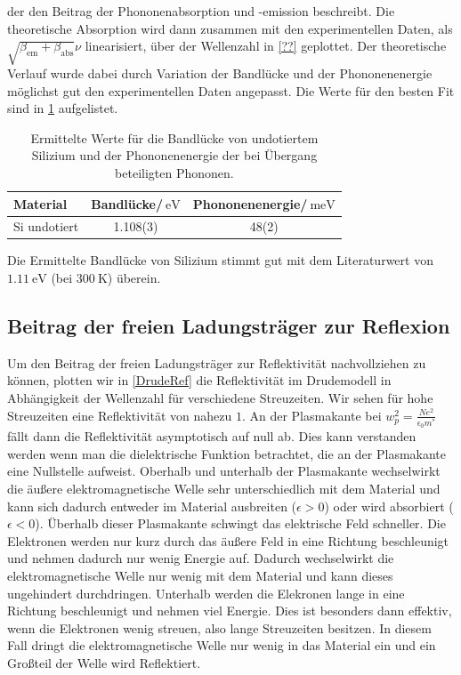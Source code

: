 \documentclass[paper=a4,fontsize=10pt,DIV=18,twocolumn,parskip=half]{scrartcl}
\numberwithin{equation}{section}    %
\begin{document}
der den Beitrag der Phononenabsorption und \mbox{-emission} beschreibt. Die 
theoretische Absorption wird dann zusammen mit den experimentellen Daten, als 
$\sqrt{\beta _{\text{em} }+\beta _{\text{abs} }}\nu $ linearisiert, über der 
Wellenzahl in \cref{??} geplottet. Der theoretische Verlauf wurde dabei durch 
Variation der Bandlücke und der Phononenenergie möglichst gut den 
experimentellen Daten angepasst. Die Werte für den besten Fit sind in \cref{phe} 
aufgelistet.
\begin{table}
    \begin{center}
\begin{tabular}{ l | c c }
  Material & Bandlücke/$\SI{}{\eV}$ & Phononenenergie/$\SI{}{\milli\eV}$\\
  \hline
  Si undotiert & 1.108(3) & 48(2)
\end{tabular}
  \caption{Ermittelte Werte für die Bandlücke von undotiertem Silizium und der 
  Phononenenergie der bei Übergang beteiligten Phononen.}
  \label{phe}
    \end{center}
\end{table}

Die Ermittelte Bandlücke von Silizium stimmt gut mit dem 
Literaturwert von $\SI{1.11}{\eV}$ \cite{kittel} (bei $\SI{300}{\K}$) überein.

\subsection{Beitrag der freien Ladungsträger zur Reflexion}

Um den Beitrag der freien Ladungsträger zur Reflektivität nachvollziehen zu 
können, plotten wir in \cref{DrudeRef} die Reflektivität im Drudemodell in 
Abhängigkeit der Wellenzahl für verschiedene Streuzeiten. Wir sehen für hohe 
Streuzeiten eine Reflektivität von nahezu $1$. An der Plasmakante bei $ 
w_p^2=\frac{N e^2}{\epsilon_0 m^*}$ fällt dann die Reflektivität asymptotisch 
auf null ab. Dies kann verstanden werden  wenn man die dielektrische Funktion 
betrachtet, die an der Plasmakante eine Nullstelle aufweist. Oberhalb und 
unterhalb der Plasmakante wechselwirkt die äußere elektromagnetische Welle sehr 
unterschiedlich mit dem Material und kann sich dadurch entweder im Material 
ausbreiten ($\epsilon > 0$) oder wird absorbiert ($\epsilon < 0$). Überhalb 
dieser Plasmakante schwingt das elektrische Feld schneller. Die Elektronen 
werden nur kurz durch das äußere Feld in eine Richtung beschleunigt und nehmen 
dadurch nur wenig Energie auf. Dadurch wechselwirkt die elektromagnetische Welle
nur wenig mit dem Material und kann dieses ungehindert durchdringen. Unterhalb 
werden die Elekronen lange in eine Richtung beschleunigt und nehmen viel 
Energie. Dies ist besonders dann effektiv, wenn die Elektronen wenig streuen, 
also lange Streuzeiten besitzen. In diesem Fall dringt die elektromagnetische 
Welle nur wenig in das Material ein und ein Großteil der Welle wird Reflektiert.
\end{document}
